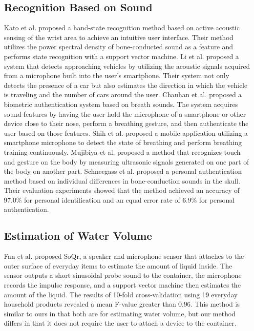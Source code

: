 \documentclass[sigconf]{acmart}
\begin{document}
\subsection{Recognition Based on Sound}
Kato et al.\cite{sound_sensing1} proposed a hand-state recognition method based on active acoustic sensing of the wrist area to achieve an intuitive user interface. Their method utilizes the power spectral density of bone-conducted sound as a feature and performs state recognition with a support vector machine.
Li et al.\cite{Auto++} proposed a system that detects approaching vehicles by utilizing the acoustic signals acquired from a microphone built into the user's smartphone. Their system not only detects the presence of a car but also estimates the direction in which the vehicle is traveling and the number of cars around the user.
Chauhan et al.\cite{BreathPrint} proposed a biometric authentication system based on breath sounds. The system acquires sound features by having the user hold the microphone of a smartphone or other device close to their nose, perform a breathing gesture, and then authenticate the user based on those features.
Shih et al.\cite{Breeze} proposed a mobile application utilizing a smartphone microphone to detect the state of breathing and perform breathing training continuously.
Mujibiya et al.\cite{sound_sensing2} proposed a method that recognizes touch and gesture on the body by measuring ultrasonic signals generated on one part of the body on another part.
Schneegass et al.\cite{SkullConduct} proposed a personal authentication method based on individual differences in bone-conduction sounds in the skull. Their evaluation experiments showed that the method achieved an accuracy of 97.0\% for personal identification and an equal error rate of 6.9\% for personal authentication.


\subsection{Estimation of Water Volume}
Fan et al.\cite{SoQr} proposed SoQr, a speaker and microphone sensor that attaches to the outer surface of everyday items to estimate the amount of liquid inside. The sensor outputs a short sinusoidal probe sound to the container, the microphone records the impulse response, and a support vector machine then estimates the amount of the liquid. The results of 10-fold cross-validation using 19 everyday household products revealed a mean F-value greater than 0.96.
This method is similar to ours in that both are for estimating water volume, but our method differs in that it does not require the user to attach a device to the container.
\end{document}
